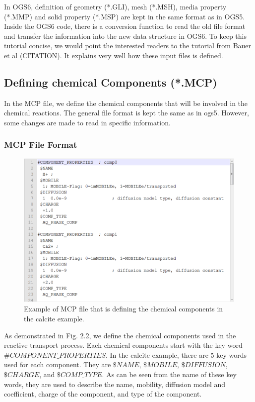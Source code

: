 In OGS6, definition of geometry (*.GLI), mesh (*.MSH), media property (*.MMP) and solid property (*.MSP) are kept in the same format as in OGS5. Inside the OGS6 code, there is a conversion function to read the old file format and transfer the information into the new data structure in OGS6. To keep this tutorial concise, we would point the interested readers to the tutorial from Bauer et al (CITATION). It explains very well how these input files is defined. 

\subsection{Defining chemical Components (*.MCP)}

In the MCP file, we define the chemical components that will be involved in the chemical reactions. The general file format is kept the same as in ogs5. However, some changes are made to read in specific information. 

\subsubsection{MCP File Format}

\begin{figure}
\includegraphics[width=\textwidth]{RT/figs/RT_fig_mcp_file}
\caption{Example of MCP file that is defining the chemical components in the calcite example.}
\label{fig:RT_mcp_file}
\end{figure}

As demonstrated in Fig. 2.2, we define the chemical components used in the reactive transport process. Each chemical components start with the key word $\#COMPONENT\_PROPERTIES$. In the calcite example, there are 5 key words used for each component. They are $\$NAME$, $\$MOBILE$, $\$DIFFUSION$, $\$CHARGE$, and $\$COMP\_TYPE$. As can be seen from the name of these key words, they are used to describe the name, mobility, diffusion model and coefficient, charge of the component, and type of the component. 

